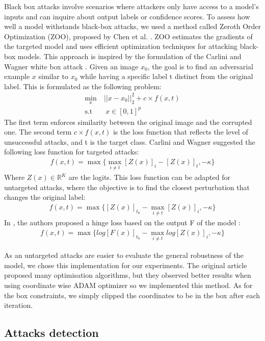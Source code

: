 \documentclass[11pt,twocolumn,letterpaper]{article}
\begin{document}
Black box attacks involve scenarios where attackers only have access to a model's inputs and can inquire about output labels or confidence scores. To assess how well a model withstands black-box attacks, we used a method called Zeroth Order Optimization (ZOO), proposed by Chen et al. \cite{Chen_2017}. ZOO estimates the gradients of the targeted model and uses efficient optimization techniques for attacking black-box models.
This approach is inspired by the formulation of the Carlini and Wagner white box attack \cite{robustness}. Given an image $x_0$, the goal is to find an adversarial example $x$ similar to $x_0$ while having a specific label t distinct from the original label. This is formulated as the following problem:
\begin{align}
   \min_x &\ ||x - x_0||_2^2 + c \times f(x,t) \\
    \text{s.t } &\ \ x \in [0,1]^p
\end{align}
The first term enforces similarity between the original image and the corrupted one. The second term $ c \times f(x,t) $ is the loss function that reflects the level of unsuccessful attacks, and t is the target class. Carlini and Wagner suggested the following loss function for targeted attacks:
\begin{align}
    f(x,t) = \max \{ \max_{i \neq t}[Z(x)]_i - [Z(x)]_t, -\kappa \}
\end{align}
Where $Z(x) \in \mathbb{R}^K$ are the logits. 
This loss function can be adapted for untargeted attacks, where the objective is to find the closest perturbation that changes the original label:
\begin{align}
    f(x,t) = \max \{[Z(x)]_{t_0} - \max_{i \neq t}[Z(x)]_i, -\kappa \}
\end{align}
In \cite{Chen_2017}, the authors proposed a hinge loss based on the output F of the model :
\begin{align}
    f(x,t) = \max \{log[F(x)]_{t_0} - \max_{i \neq t}log[Z(x)]_i, -\kappa \}
\end{align}

As an untargeted attacks are easier to evaluate the general robustness of the model, we chose this implementation for our experiments. The original article proposed many optimisation algorithms, but they observed better results when using coordinate wise ADAM optimizer so we implemented this method. As for the box constraints, we simply clipped the coordinates to be in the box after each iteration.

\subsection{Attacks detection}
\end{document}
